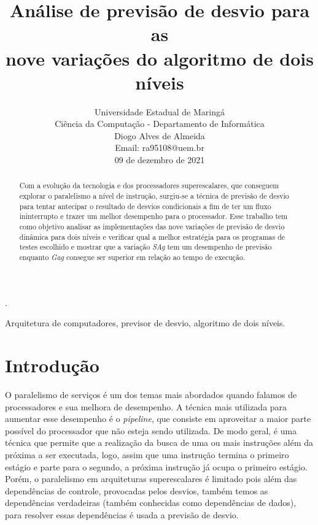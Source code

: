 \documentclass[journal, twoside]{IEEEtran}
\begin{document}
 
\setcounter{page}{1}%
\title{Análise de previsão de desvio para as \\ nove variações do algoritmo de dois níveis}


\author{Universidade Estadual de Maringá\\
Ciência da Computação - Departamento de Informática\\ 
Diogo Alves de Almeida \\
Email: ra95108@uem.br \\
09 de dezembro de 2021}


\maketitle

\begin{abstract}
Com a evolução da tecnologia e dos processadores superescalares, que conseguem explorar o paralelismo a nível de instrução, surgiu-se a técnica de previsão de desvio para tentar antecipar o resultado de desvios condicionais a fim de ter um fluxo ininterrupto e trazer um melhor desempenho para o processador. Esse trabalho tem como objetivo analisar as implementações das nove variações de previsão de desvio dinâmica para dois níveis e verificar qual a melhor estratégia para os programas de testes escolhido e mostrar que a variação \textit{SAg} tem um desempenho de previsão enquanto \textit{Gag} consegue ser superior em relação ao tempo de execução.
\end{abstract}
.
\begin{IEEEkeywords}
Arquitetura de computadores, previsor de desvio, algoritmo de dois níveis.
\end{IEEEkeywords}

\IEEEpeerreviewmaketitle

\section{Introdução}
O paralelismo de serviços é um dos temas mais abordados quando falamos de processadores e sua melhora de desempenho. A técnica mais utilizada para aumentar esse desempenho é o \textit{pipeline}, que consiste em aproveitar a maior parte possível do processador que não esteja sendo utilizada. De modo geral, é uma técnica que permite que a realização da busca de uma ou mais instruções além da próxima a ser executada, logo, assim que uma instrução termina o primeiro estágio e parte para o segundo, a próxima instrução já ocupa o primeiro estágio. Porém, o paralelismo em arquiteturas superescalares é limitado pois além das dependências de controle, provocadas pelos desvios, também temos as dependências verdadeiras (também conhecidas como dependências de dados), para resolver essas dependências é usada a previsão de desvio.
\end{document}
